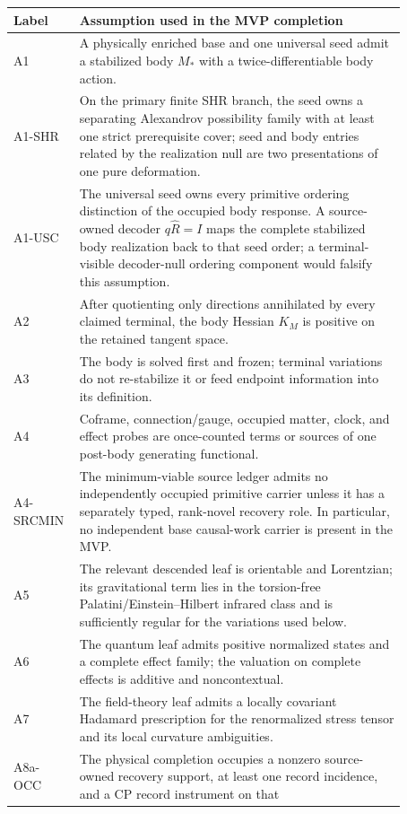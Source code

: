 \documentclass[11pt]{article}
\begin{document}
\begin{center}
\small
\begin{tabular}{L{0.10\linewidth}L{0.77\linewidth}}
\toprule
Label & Assumption used in the MVP completion\\
\midrule
A1 & A physically enriched base and one universal seed admit a stabilized
body \(M_*\) with a twice-differentiable body action.\\
A1-SHR & On the primary finite SHR branch, the seed owns a separating
Alexandrov possibility family with at least one strict prerequisite cover;
seed and body entries related by the realization null are two presentations
of one pure deformation.\\
A1-USC & The universal seed owns every primitive ordering distinction of the
occupied body response.  A source-owned decoder
\(q\widehat R=I\) maps the
complete stabilized body realization back to that seed order; a
terminal-visible decoder-null ordering component would falsify this assumption.\\
A2 & After quotienting only directions annihilated by every claimed terminal,
the body Hessian \(K_M\) is positive on the retained tangent space.\\
A3 & The body is solved first and frozen; terminal variations do not
re-stabilize it or feed endpoint information into its definition.\\
A4 & Coframe, connection/gauge, occupied matter, clock, and effect probes are
once-counted terms or sources of one post-body generating functional.\\
A4-SRCMIN & The minimum-viable source ledger admits no independently occupied
primitive carrier unless it has a separately typed, rank-novel recovery role.
In particular, no independent base causal-work carrier is present in the MVP.\\
A5 & The relevant descended leaf is orientable and Lorentzian; its
gravitational term lies in the torsion-free Palatini/Einstein--Hilbert
infrared class and is sufficiently regular for the variations used below.\\
A6 & The quantum leaf admits positive normalized states and a complete effect
family; the valuation on complete effects is additive and noncontextual.\\
A7 & The field-theory leaf admits a locally covariant Hadamard prescription for
the renormalized stress tensor and its local curvature ambiguities.\\
A8a-OCC & The physical completion occupies a nonzero source-owned recovery
support, at least one record incidence, and a CP record instrument on that

\end{tabular}
\end{center}
\end{document}
